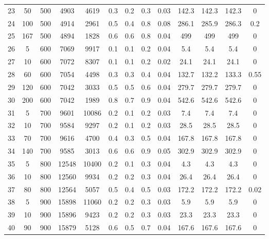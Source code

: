 \documentclass[11pt]{article}
\begin{document}
\begin{appendices}
\begin{landscape}
\begin{longtable}[c]{ccccc|cccc|cccc}
				\rowcolor[HTML]{EFEFEF} 
				23 & 50  & 500 & 4903  & 4619  & 0.3 & 0.2 & 0.3 & 0.03 & 142.3 & 142.3 & 142.3 & 0    \\
				\rowcolor[HTML]{EFEFEF} 
				24 & 100 & 500 & 4914  & 2961  & 0.5 & 0.4 & 0.8 & 0.08 & 286.1 & 285.9 & 286.3 & 0.2  \\
				\rowcolor[HTML]{EFEFEF} 
				25 & 167 & 500 & 4894  & 1828  & 0.6 & 0.6 & 0.8 & 0.04 & 499   & 499   & 499   & 0    \\
				26 & 5   & 600 & 7069  & 9917  & 0.1 & 0.1 & 0.2 & 0.04 & 5.4   & 5.4   & 5.4   & 0    \\
				27 & 10  & 600 & 7072  & 8307  & 0.1 & 0.1 & 0.2 & 0.02 & 24.1  & 24.1  & 24.1  & 0    \\
				28 & 60  & 600 & 7054  & 4498  & 0.3 & 0.3 & 0.4 & 0.04 & 132.7 & 132.2 & 133.3 & 0.55 \\
				29 & 120 & 600 & 7042  & 3033  & 0.5 & 0.5 & 0.6 & 0.04 & 279.7 & 279.7 & 279.7 & 0    \\
				30 & 200 & 600 & 7042  & 1989  & 0.8 & 0.7 & 0.9 & 0.04 & 542.6 & 542.6 & 542.6 & 0    \\
				\rowcolor[HTML]{EFEFEF} 
				31 & 5   & 700 & 9601  & 10086 & 0.2 & 0.1 & 0.2 & 0.03 & 7.4   & 7.4   & 7.4   & 0    \\
				\rowcolor[HTML]{EFEFEF} 
				32 & 10  & 700 & 9584  & 9297  & 0.2 & 0.1 & 0.2 & 0.03 & 28.5  & 28.5  & 28.5  & 0    \\
				\rowcolor[HTML]{EFEFEF} 
				33 & 70  & 700 & 9616  & 4700  & 0.4 & 0.3 & 0.5 & 0.04 & 167.8 & 167.8 & 167.8 & 0    \\
				\rowcolor[HTML]{EFEFEF} 
				34 & 140 & 700 & 9585  & 3013  & 0.6 & 0.6 & 0.9 & 0.05 & 302.9 & 302.9 & 302.9 & 0    \\
				35 & 5   & 800 & 12548 & 10400 & 0.2 & 0.1 & 0.3 & 0.04 & 4.3   & 4.3   & 4.3   & 0    \\
				36 & 10  & 800 & 12560 & 9934  & 0.2 & 0.2 & 0.3 & 0.04 & 26.4  & 26.4  & 26.4  & 0    \\
				37 & 80  & 800 & 12564 & 5057  & 0.5 & 0.4 & 0.5 & 0.03 & 172.2 & 172.2 & 172.2 & 0.02 \\
				\rowcolor[HTML]{EFEFEF} 
				38 & 5   & 900 & 15898 & 11060 & 0.2 & 0.2 & 0.3 & 0.03 & 5.9   & 5.9   & 5.9   & 0    \\
				\rowcolor[HTML]{EFEFEF} 
				39 & 10  & 900 & 15896 & 9423  & 0.2 & 0.2 & 0.3 & 0.03 & 23.3  & 23.3  & 23.3  & 0    \\
				\rowcolor[HTML]{EFEFEF} 
				40 & 90  & 900 & 15879 & 5128  & 0.6 & 0.5 & 0.7 & 0.04 & 167.6 & 167.6 & 167.6 & 0   
			\end{longtable}
		\end{landscape}
		

\end{appendices}
\end{document}
